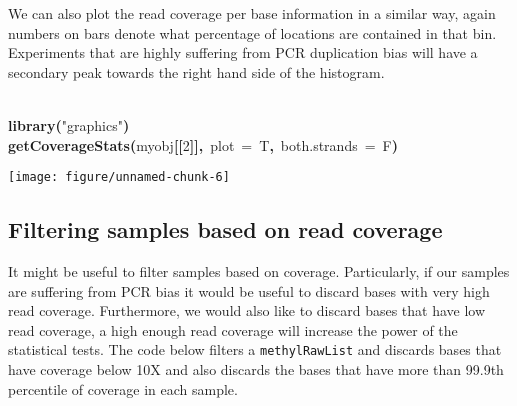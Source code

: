 \documentclass{article}
\makeatletter
\newcommand{\hlnumber}[1]{\textcolor[rgb]{0,0,0}{#1}}%
\newcommand{\hlfunctioncall}[1]{\textcolor[rgb]{.5,0,.33}{\textbf{#1}}}%
\newcommand{\hlstring}[1]{\textcolor[rgb]{.6,.6,1}{#1}}%
\newcommand{\hlkeyword}[1]{\textbf{#1}}%
\newcommand{\hlargument}[1]{\textcolor[rgb]{.69,.25,.02}{#1}}%
\newcommand{\hlsymbol}[1]{#1}%
\newcommand{\hlstd}[1]{\textcolor[rgb]{0,0,0}{#1}}%
\newenvironment{kframe}{%
 \def\FrameCommand##1{\hskip\@totalleftmargin \hskip-\fboxsep
 \colorbox{shadecolor}{##1}\hskip-\fboxsep
     \hskip-\linewidth \hskip-\@totalleftmargin \hskip\columnwidth}%
 \MakeFramed {\advance\hsize-\width
   \@totalleftmargin\z@ \linewidth\hsize
   \@setminipage}}%
 {\par\unskip\endMakeFramed}
\newenvironment{knitrout}{}{} %
\makeatother
\begin{document}
We can also plot the read coverage per base information in a similar way, again numbers on bars denote what percentage of locations are contained in that bin. Experiments that are highly suffering from PCR duplication bias will have a secondary peak towards the right hand side of the histogram.


\begin{center}
\begin{knitrout}
\color{fgcolor}\begin{kframe}
\begin{flushleft}
\ttfamily\noindent
\hspace*{\fill}\\
\hlstd{}\hlfunctioncall{library}\hlkeyword{(}\hlstring{"{}graphics"{}}\hlkeyword{)}\hspace*{\fill}\\
\hlstd{}\hlfunctioncall{getCoverageStats}\hlkeyword{(}\hlsymbol{myobj}\hlkeyword{[[}\hlnumber{2}\hlkeyword{]}\hlkeyword{]}\hlkeyword{,}{\ }\hlargument{plot}{\ }\hlargument{=}{\ }\hlsymbol{T}\hlkeyword{,}{\ }\hlargument{both.strands}{\ }\hlargument{=}{\ }\hlsymbol{F}\hlkeyword{)}\mbox{}
\normalfont
\end{flushleft}
\end{kframe}

{\centering \texttt{[image: figure/unnamed-chunk-6]} 

}


\end{knitrout}

\end{center}

\subsection{Filtering samples based on read coverage}
It might be useful to filter samples based on coverage. Particularly, if our samples are suffering from PCR bias it would be useful to discard bases with very high read coverage. Furthermore, we would also like to discard bases that have low read coverage, a high enough read coverage will increase the power of the statistical tests. The code below filters a \texttt{methylRawList} and discards bases that have coverage below 10X and also discards the bases that have more than 99.9th percentile of coverage in each sample.
\end{document}
